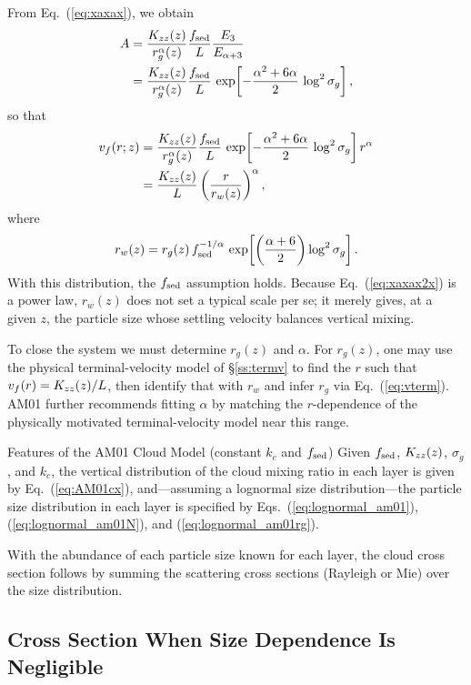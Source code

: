 From Eq.~(\ref{eq:xaxax}), we obtain
\begin{align}
\label{eq:xaxax2}
 A &= \frac{K_{zz}(z)}{r_g^\alpha(z)} \frac{f_\mathrm{sed}}{L} \frac{E_3}{E_{\alpha+3}} \nonumber \\
 &= \frac{K_{zz}(z)}{r_g^\alpha(z)} \frac{f_\mathrm{sed}}{L}\, 
 \exp\!\left[ -\frac{\alpha^2 + 6 \alpha}{2}\, \log^2{\sigma_g} \right],
\end{align}
so that
\begin{align}
\label{eq:xaxax2x}
 v_f(r;z) &= \frac{K_{zz}(z)}{r_g^\alpha(z)} \frac{f_\mathrm{sed}}{L}\,
 \exp\!\left[ -\frac{\alpha^2 + 6 \alpha}{2}\, \log^2{\sigma_g} \right] r^\alpha \\
  &= \frac{K_{zz}(z)}{L} \left( \frac{r}{r_w(z)} \right)^\alpha,
\end{align}
where
\begin{align}
\label{eq:lognormal_am01rg}
r_w(z) = r_g(z)\, f_\mathrm{sed}^{-1/\alpha}\, \exp\!\left[ \left(\frac{\alpha+6}{2} \right) \log^2{\sigma_g}\right].
\end{align}
With this distribution, the $f_\mathrm{sed}$ assumption holds.  
Because Eq.~(\ref{eq:xaxax2x}) is a power law, $r_w(z)$ does not set a typical scale per se; it merely gives, at a given $z$, the particle size whose settling velocity balances vertical mixing.

To close the system we must determine $r_g(z)$ and $\alpha$.  
For $r_g(z)$, one may use the physical terminal-velocity model of §\ref{ss:termv} to find the $r$ such that $v_f(r)=K_{zz}(z)/L$, then identify that with $r_w$ and infer $r_g$ via Eq.~(\ref{eq:vterm}).  
AM01 further recommends fitting $\alpha$ by matching the $r$-dependence of the physically motivated terminal-velocity model near this range.

\begin{itembox}{Features of the AM01 Cloud Model (constant $k_c$ and $f_\mathrm{sed}$)}
Given $f_\mathrm{sed}$, $K_{zz}(z)$, $\sigma_g$, and $k_c$, the vertical distribution of the cloud mixing ratio in each layer is given by Eq.~(\ref{eq:AM01cx}), and—assuming a lognormal size distribution—the particle size distribution in each layer is specified by Eqs.~(\ref{eq:lognormal_am01}), (\ref{eq:lognormal_am01N}), and (\ref{eq:lognormal_am01rg}).
\end{itembox}

With the abundance of each particle size known for each layer, the cloud cross section follows by summing the scattering cross sections (Rayleigh or Mie) over the size distribution.

\subsection*{Cross Section When Size Dependence Is Negligible}

